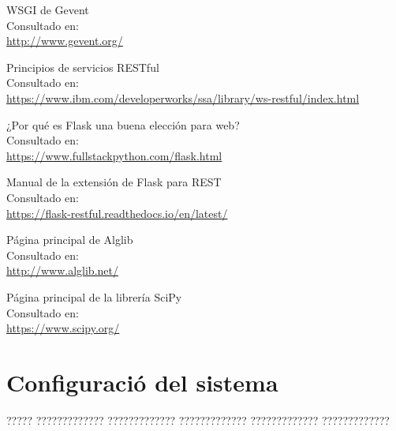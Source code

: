 \documentclass[12pt,spanish,listoffigures,listoftables]{tfgetsinf}
\begin{document}
\begin{thebibliography}{10}
	WSGI de Gevent \\
	\newblock Consultado en: \\
	\url{http://www.gevent.org/}
	
	Principios de servicios RESTful \\
	\newblock Consultado en: \\
	\url{https://www.ibm.com/developerworks/ssa/library/ws-restful/index.html}
	
	¿Por qué es Flask una buena elección para web? \\
	\newblock Consultado en: \\
	\url{https://www.fullstackpython.com/flask.html}
	
	Manual de la extensión de Flask para REST \\
	\newblock Consultado en: \\
	\url{https://flask-restful.readthedocs.io/en/latest/}
	
	Página principal de Alglib \\
	\newblock Consultado en: \\
	\url{http://www.alglib.net/}
	
	Página principal de la librería SciPy\\
	\newblock Consultado en: \\
	\url{https://www.scipy.org/}
	

\end{thebibliography}
\cleardoublepage


\APPENDIX


\chapter{Configuració del sistema}

????? ????????????? ????????????? ????????????? ????????????? ?????????????
\end{document}
